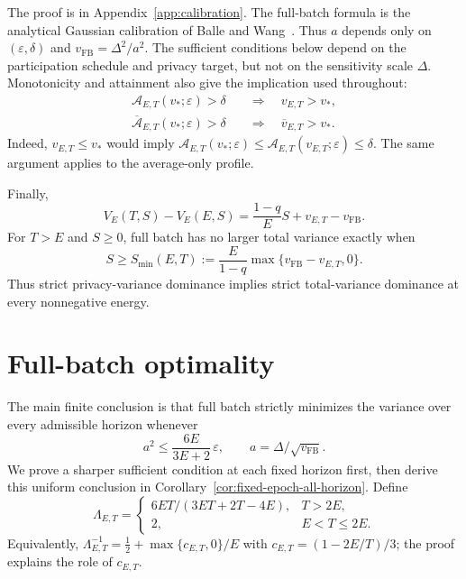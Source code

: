 \documentclass[11pt]{article}
\theoremstyle{remark}
\begin{document}
The proof is in Appendix~\ref{app:calibration}. The full-batch formula is the
analytical Gaussian calibration of Balle and Wang~\cite{ballewang2018}.
Thus $a$ depends only on $(\varepsilon,\delta)$ and
$v_{\mathrm{FB}}=\Delta^2/a^2$. The sufficient conditions below depend
on the participation schedule and privacy target, but not on the sensitivity
scale $\Delta$.
Monotonicity and attainment also give the implication used throughout:
\begin{equation}\label{eq:calibration-transfer}
 \begin{aligned}
 \mathcal A_{E,T}(v_*;\varepsilon)>\delta
 &\quad\Longrightarrow\quad v_{E,T}>v_*,\\
 \overline{\mathcal A}_{E,T}(v_*;\varepsilon)>\delta
 &\quad\Longrightarrow\quad \overline v_{E,T}>v_*.
 \end{aligned}
\end{equation}
Indeed, $v_{E,T}\leq v_*$ would imply
$\mathcal A_{E,T}(v_*;\varepsilon)
\leq\mathcal A_{E,T}(v_{E,T};\varepsilon)\leq\delta$.
The same argument applies to the average-only profile.

Finally,
\[
 V_E(T,S)-V_E(E,S)=\frac{1-q}{E}S+v_{E,T}-v_{\mathrm{FB}}.
\]
For $T>E$ and $S\geq0$, full batch has no larger total variance exactly when
\begin{equation}\label{eq:threshold}
 S\geq S_{\min}(E,T):=
 \frac{E}{1-q}\max\{v_{\mathrm{FB}}-v_{E,T},0\}.
\end{equation}
Thus strict privacy-variance dominance implies strict total-variance
dominance at every nonnegative energy.

\section{Full-batch optimality}\label{sec:near-full}
The main finite conclusion is that full batch strictly minimizes the variance
over every admissible horizon whenever
\[
 a^2\leq\frac{6E}{3E+2}\,\varepsilon,
 \qquad a=\Delta/\sqrt{v_{\mathrm{FB}}}.
\]
We prove a sharper sufficient condition at each fixed horizon first, then
derive this uniform conclusion in Corollary~\ref{cor:fixed-epoch-all-horizon}.
Define
\begin{equation}\label{eq:rate-adaptive-signal-factor}
 \Lambda_{E,T}=\begin{cases}
  6ET/(3ET+2T-4E),&T>2E,\\
  2,&E<T\leq2E.
 \end{cases}
\end{equation}
Equivalently,
$\Lambda_{E,T}^{-1}=\tfrac12+\max\{c_{E,T},0\}/E$ with
$c_{E,T}=(1-2E/T)/3$; the proof explains the role of $c_{E,T}$.
\end{document}
